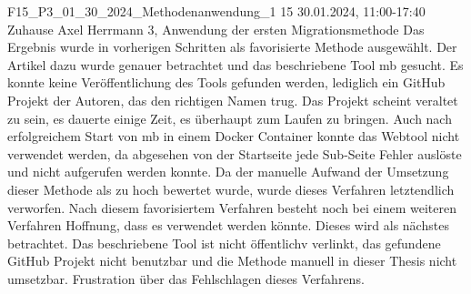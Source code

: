 \fieldnote
{F15\_P3\_01\_30\_2024\_Methodenanwendung\_1}
{15}
{30.01.2024, 11:00-17:40}
{Zuhause}
{Axel Herrmann}
{3, Anwendung der ersten Migrationsmethode}
{
  Das Ergebnis  wurde in vorherigen Schritten als favorisierte Methode ausgewählt.
  Der Artikel dazu wurde genauer betrachtet und das beschriebene Tool \acrfull{mb} gesucht.
  Es konnte keine Veröffentlichung des Tools gefunden werden, lediglich ein GitHub Projekt der Autoren, das den richtigen Namen trug.
  Das Projekt scheint veraltet zu sein, es dauerte einige Zeit, es überhaupt zum Laufen zu bringen.
  Auch nach erfolgreichem Start von \gls{mb} in einem Docker Container konnte das Webtool nicht verwendet werden, da abgesehen von der Startseite jede Sub-Seite Fehler auslöste und nicht aufgerufen werden konnte.
  Da der manuelle Aufwand der Umsetzung dieser Methode als zu hoch bewertet wurde, wurde dieses Verfahren letztendlich verworfen.
}
{
  Nach diesem favorisiertem Verfahren besteht noch bei einem weiteren Verfahren Hoffnung, dass es verwendet werden könnte.
  Dieses wird als nächstes betrachtet.
}
{
}
{
  Das beschriebene Tool ist nicht öffentlichv verlinkt, das gefundene GitHub Projekt nicht benutzbar und die Methode manuell in dieser Thesis nicht umsetzbar.
}
{
  Frustration über das Fehlschlagen dieses Verfahrens.
}
